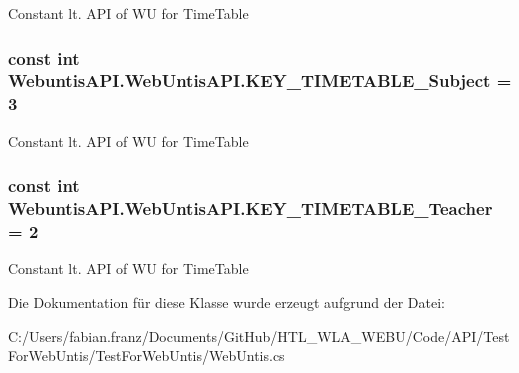 Constant lt. A\-P\-I of W\-U for Time\-Table \hypertarget{class_webuntis_a_p_i_1_1_web_untis_a_p_i_a675f0bc99b9300bfb0b582df0b1fd5a7}{
\subsubsection[{K\-E\-Y\-\_\-\-T\-I\-M\-E\-T\-A\-B\-L\-E\-\_\-\-Subject}]{\setlength{\rightskip}{0pt plus 5cm}const int Webuntis\-A\-P\-I.\-Web\-Untis\-A\-P\-I.\-K\-E\-Y\-\_\-\-T\-I\-M\-E\-T\-A\-B\-L\-E\-\_\-\-Subject = 3}}\label{class_webuntis_a_p_i_1_1_web_untis_a_p_i_a675f0bc99b9300bfb0b582df0b1fd5a7}
Constant lt. A\-P\-I of W\-U for Time\-Table \hypertarget{class_webuntis_a_p_i_1_1_web_untis_a_p_i_ad93ea508e78c71d5b4a97bab65322115}{
\subsubsection[{K\-E\-Y\-\_\-\-T\-I\-M\-E\-T\-A\-B\-L\-E\-\_\-\-Teacher}]{\setlength{\rightskip}{0pt plus 5cm}const int Webuntis\-A\-P\-I.\-Web\-Untis\-A\-P\-I.\-K\-E\-Y\-\_\-\-T\-I\-M\-E\-T\-A\-B\-L\-E\-\_\-\-Teacher = 2}}\label{class_webuntis_a_p_i_1_1_web_untis_a_p_i_ad93ea508e78c71d5b4a97bab65322115}
Constant lt. A\-P\-I of W\-U for Time\-Table 

Die Dokumentation für diese Klasse wurde erzeugt aufgrund der Datei\-:\begin{DoxyCompactItemize}
\item 
C\-:/\-Users/fabian.\-franz/\-Documents/\-Git\-Hub/\-H\-T\-L\-\_\-\-W\-L\-A\-\_\-\-W\-E\-B\-U/\-Code/\-A\-P\-I/\-Test\-For\-Web\-Untis/\-Test\-For\-Web\-Untis/Web\-Untis.\-cs\end{DoxyCompactItemize}
